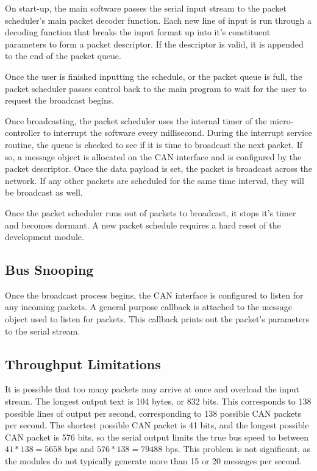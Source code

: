 On start-up, the main software passes the serial input stream to the packet scheduler's main packet decoder function. Each new line of input is run through a decoding function that breaks the input format up into it's constituent parameters to form a packet descriptor. If the descriptor is valid, it is appended to the end of the packet queue.

Once the user is finished inputting the schedule, or the packet queue is full, the packet scheduler passes control back to the main program to wait for the user to request the broadcast begins.

Once broadcasting, the packet scheduler uses the internal timer of the micro-controller to interrupt the software every millisecond. During the interrupt service routine, the queue is checked to see if it is time to broadcast the next packet. If so, a message object is allocated on the CAN interface and is configured by the packet descriptor. Once the data payload is set, the packet is broadcast across the network. If any other packets are scheduled for the same time interval, they will be broadcast as well. 

Once the packet scheduler runs out of packets to broadcast, it stops it's timer and becomes dormant. A new packet schedule requires a hard reset of the development module.

\subsection{Bus Snooping}

Once the broadcast process begins, the CAN interface is configured to listen for any incoming packets. A general purpose callback is attached to the message object used to listen for packets. This callback prints out the packet's parameters to the serial stream. 

\subsection{Throughput Limitations}

It is possible that too many packets may arrive at once and overload the input stream. The longest output text is 104 bytes, or 832 bits. This corresponds to 138 possible lines of output per second, corresponding to 138 possible CAN packets per second. The shortest possible CAN packet is 41 bits, and the longest possible CAN packet is 576 bits, so the serial output limits the true bus speed to between $41*138 = 5658$ bps and $576 * 138 = 79488$ bps. This problem is not significant, as the modules do not typically generate more than 15 or 20 messages per second.

